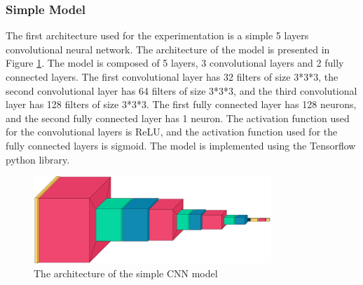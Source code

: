 \documentclass[12pt, letterpaper]{article}
\begin{document}
\subsubsection{Simple Model}

The first architecture used for the experimentation is a simple 5 layers convolutional neural network. The architecture of the model is presented in Figure \ref{fig:CNN}. The model is composed of 5 layers, 3 convolutional layers and 2 fully connected layers. The first convolutional layer has 32 filters of size 3*3*3, the second convolutional layer has 64 filters of size 3*3*3, and the third convolutional layer has 128 filters of size 3*3*3. The first fully connected layer has 128 neurons, and the second fully connected layer has 1 neuron. The activation function used for the convolutional layers is ReLU, and the activation function used for the fully connected layers is sigmoid. The model is implemented using the Tensorflow python library.
\begin{figure}[h]
    \centering
    \includegraphics[width=0.8\textwidth]{CNN.png}
    \caption{The architecture of the simple CNN model}
    \label{fig:CNN}
\end{figure}
\end{document}
